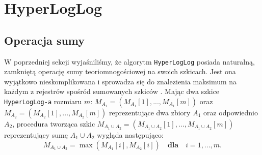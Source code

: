 \section{HyperLogLog}

\subsection{Operacja sumy}
\label{HLL_sum}

W poprzedniej sekcji wyjaśniliśmy, że algorytm \texttt{HyperLogLog} posiada naturalną, zamkniętą operację sumy teoriomnogościowej na swoich szkicach. Jest ona wyjątkowo nieskomplikowana i sprowadza się do znalezienia maksimum na każdym z rejestrów spośród sumowanych szkiców \cite{oertl}. Mając dwa szkice \texttt{HyperLogLog-a} rozmiaru $m$: $M_{A_1} = (M_{A_1}[1], ..., M_{A_1}[m])$ oraz $M_{A_2} = (M_{A_2}[1], ..., M_{A_2}[m])$ reprezentujące dwa zbiory $A_1$ oraz odpowiednio $A_2$, procedura tworząca szkic $M_{A_1 \cup A_2} = (M_{A_1 \cup A_2}[1], ..., M_{A_1 \cup A_2}[m])$ reprezentujący sumę $A_1 \cup A_2$ wygląda następująco:
\begin{equation}
    M_{A_1 \cup A_2} = \max(M_{A_1}[i], M_{A_2}[i]) \quad \textbf{dla} \quad i = 1, ..., m.
\end{equation}

